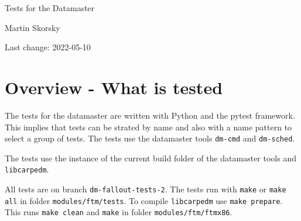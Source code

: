 \documentclass[12pt,a4paper]{report}
\begin{document}
\begin{titlepage}
\vspace{2cm}
\begin{center}
\Huge{Tests for the Datamaster}

\Large{Martin Skorsky}

\Large{Last change: 2022-05-10}
\end{center}
\vfill
\end{titlepage}

\tableofcontents

\chapter{Overview - What is tested}
The tests for the datamaster are written with Python and the pytest framework. This implies that tests can be strated
by name and also with a name pattern to select a group of tests. The tests use the datamaster tools \texttt{dm-cmd}
and \texttt{dm-sched}.

The tests use the instance of the current build folder of the datamaster tools and \texttt{libcarpedm}.

All tests are on branch \texttt{dm-fallout-tests-2}. The tests run with \texttt{make} or \texttt{make all} in folder \texttt{modules/ftm/tests}.
To compile \texttt{libcarpedm} use \texttt{make prepare}. This runs \texttt{make clean} and \texttt{make} in folder \texttt{modules/ftm/ftmx86}.
\end{document}
